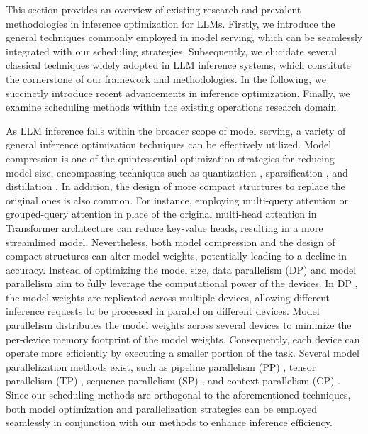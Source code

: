

This section provides an overview of existing research and prevalent methodologies in inference optimization for LLMs. Firstly, we introduce the general techniques commonly employed in model serving, which can be seamlessly integrated with our scheduling strategies. Subsequently, we elucidate several classical techniques widely adopted in LLM inference systems, which constitute the cornerstone of our framework and methodologies. In the following, we succinctly introduce recent advancements in inference optimization. Finally, we examine scheduling methods within the existing operations research domain.


As LLM inference falls within the broader scope of model serving, a variety of general inference optimization techniques can be effectively utilized. Model compression is one of the quintessential optimization strategies for reducing model size, encompassing techniques such as quantization \cite{jacob2018quantization}, sparsification \cite{child2019generating,bai2024sparsellm}, and distillation \cite{hinton2015distilling}. In addition, the design of more compact structures to replace the original ones is also common. For instance, employing multi-query attention \cite{shazeer2019fast} or grouped-query attention \cite{ainslie2023gqa} in place of the original multi-head attention in Transformer architecture can reduce key-value heads, resulting in a more streamlined model. Nevertheless, both model compression and the design of compact structures can alter model weights, potentially leading to a decline in accuracy. Instead of optimizing the model size, data parallelism (DP) and model parallelism aim to fully leverage the computational power of the devices. In DP \cite{narayanan2021efficient}, the model weights are replicated across multiple devices, allowing different inference requests to be processed in parallel on different devices. Model parallelism distributes the model weights across several devices to minimize the per-device memory footprint of the model weights. Consequently, each device can operate more efficiently by executing a smaller portion of the task. Several model parallelization methods exist, such as pipeline parallelism (PP) \cite{huang2019gpipe}, tensor parallelism (TP) \cite{shoeybi2019megatron}, sequence parallelism (SP) \cite{korthikanti2023reducing}, and context parallelism (CP) \cite{liu2023ring}. Since our scheduling methods are orthogonal to the aforementioned techniques, both model optimization and parallelization strategies can be employed seamlessly in conjunction with our methods to enhance inference efficiency.

